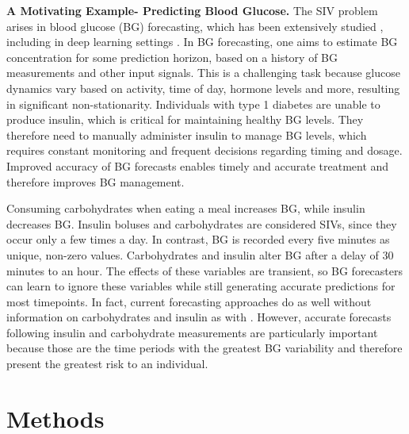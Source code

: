 \documentclass[letterpaper]{article}
\begin{document}
\textbf{A Motivating Example- Predicting Blood Glucose.} The SIV problem arises in blood glucose (BG) forecasting, which has been extensively studied \cite{glureview}, including in deep learning settings \cite{drf,iankdd,gluexps}. In BG forecasting, one aims to estimate BG concentration for some prediction horizon, based on a history of BG measurements and other input signals. This is a challenging task because glucose dynamics vary based on activity, time of day, hormone levels and more, resulting in significant non-stationarity.  Individuals with type 1 diabetes are unable to produce insulin, which is critical for maintaining healthy BG levels. They therefore need to manually administer insulin to manage BG levels, which requires constant monitoring and frequent decisions regarding timing and dosage. Improved accuracy of BG forecasts enables timely and accurate treatment and therefore improves BG management.

Consuming carbohydrates when eating a meal increases BG, while insulin decreases BG. Insulin boluses and carbohydrates are considered SIVs, since they occur only a few times a day. In contrast, BG is recorded every five minutes as unique, non-zero values. Carbohydrates and insulin alter BG after a delay of 30 minutes to an hour. The effects of these variables are transient, so BG forecasters can learn to ignore these variables while still generating accurate predictions for most timepoints. In fact, current forecasting approaches do as well without information on carbohydrates and insulin as with \cite{drf,klein,marshall}.  However, accurate forecasts following insulin and carbohydrate measurements are particularly important because those are the time periods with the greatest BG variability and therefore present the greatest risk to an individual.




\section{Methods}
\end{document}
